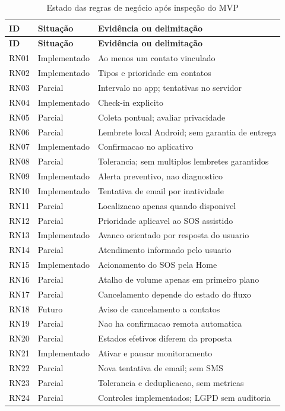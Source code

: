 \begin{longtable}{p{1.25cm}p{2.2cm}p{10.0cm}}
\caption{Estado das regras de negócio após inspeção do MVP}\label{tab_status_rn}\\
\hline
\textbf{ID} & \textbf{Situação} & \textbf{Evidência ou delimitação} \\
\hline
\endfirsthead
\hline
\textbf{ID} & \textbf{Situação} & \textbf{Evidência ou delimitação} \\
\hline
\endhead
RN01 & Implementado & Ao menos um contato vinculado \\
\hline
RN02 & Implementado & Tipos e prioridade em contatos \\
\hline
RN03 & Parcial & Intervalo no app; tentativas no servidor \\
\hline
RN04 & Implementado & Check-in explicito \\
\hline
RN05 & Parcial & Coleta pontual; avaliar privacidade \\
\hline
RN06 & Parcial & Lembrete local Android; sem garantia de entrega \\
\hline
RN07 & Implementado & Confirmacao no aplicativo \\
\hline
RN08 & Parcial & Tolerancia; sem multiplos lembretes garantidos \\
\hline
RN09 & Implementado & Alerta preventivo, nao diagnostico \\
\hline
RN10 & Implementado & Tentativa de email por inatividade \\
\hline
RN11 & Parcial & Localizacao apenas quando disponivel \\
\hline
RN12 & Parcial & Prioridade aplicavel ao SOS assistido \\
\hline
RN13 & Implementado & Avanco orientado por resposta do usuario \\
\hline
RN14 & Parcial & Atendimento informado pelo usuario \\
\hline
RN15 & Implementado & Acionamento do SOS pela Home \\
\hline
RN16 & Parcial & Atalho de volume apenas em primeiro plano \\
\hline
RN17 & Parcial & Cancelamento depende do estado do fluxo \\
\hline
RN18 & Futuro & Aviso de cancelamento a contatos \\
\hline
RN19 & Parcial & Nao ha confirmacao remota automatica \\
\hline
RN20 & Parcial & Estados efetivos diferem da proposta \\
\hline
RN21 & Implementado & Ativar e pausar monitoramento \\
\hline
RN22 & Parcial & Nova tentativa de email; sem SMS \\
\hline
RN23 & Parcial & Tolerancia e deduplicacao, sem metricas \\
\hline
RN24 & Parcial & Controles implementados; LGPD sem auditoria \\
\hline
\end{longtable}

